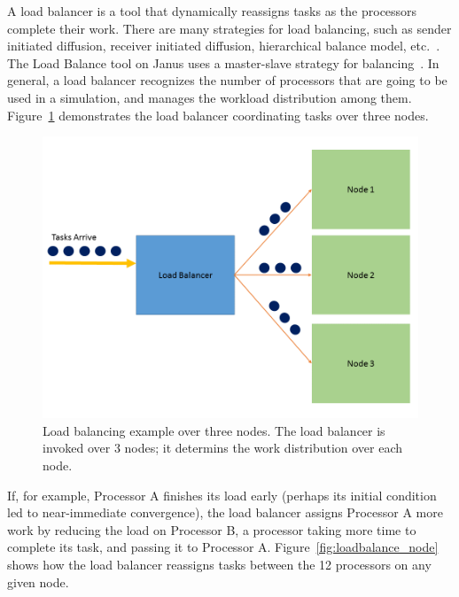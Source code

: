 A load balancer is a tool that dynamically reassigns tasks as the
processors complete their work. There are many strategies for load
balancing, such as sender initiated diffusion, receiver initiated
diffusion, hierarchical balance model, etc.~\cite{dlb}. The Load
Balance tool on Janus uses a master-slave strategy for
balancing~\cite{janus}. In general, a load balancer recognizes the
number of processors that are going to be used in a simulation, and manages
the workload distribution among
them. Figure~\ref{fig:loadbalance_overall} demonstrates the load
balancer coordinating tasks over three nodes. 
\begin{figure}[H]\linespread{1}   
\caption[Load Balancing Example]{Load balancing example over
  three nodes. The load balancer is invoked over 3 nodes; it determins
the work distribution over each node.}\label{fig:loadbalance_overall}
	\begin{center}
          \includegraphics[scale=0.35]{figs/loadbalance_overall.png}
	\end{center}
\end{figure}
If, for example, Processor A finishes its load early
(perhaps its initial condition led to near-immediate convergence),
the load balancer assigns Processor A more work by reducing the
load on Processor B, a processor taking more time to complete its
task, and passing it to Processor A. Figure~\ref{fig:loadbalance_node}
shows how the load balancer reassigns tasks between the 12 processors
on any given node.
